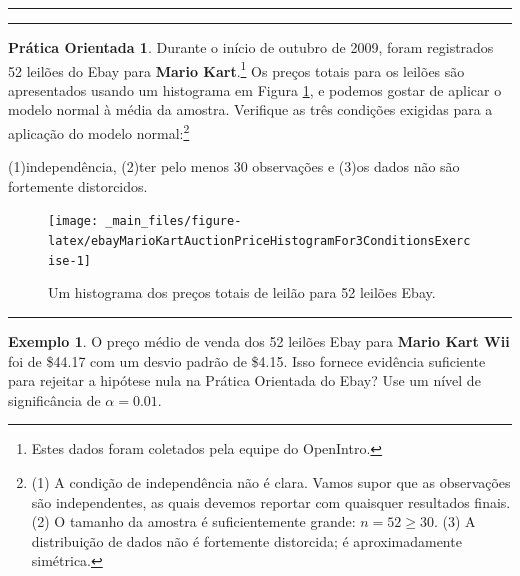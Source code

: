 \documentclass[
]{book}
\theoremstyle{definition}
\theoremstyle{definition}
\newtheorem{example}{Exemplo}[chapter]
\theoremstyle{definition}
\newtheorem{exercise}{Prática Orientada}[chapter]
\theoremstyle{definition}
\theoremstyle{remark}
\begin{document}
\begin{center}\rule{0.5\linewidth}{0.5pt}\end{center}

\begin{center}\rule{0.5\linewidth}{0.5pt}\end{center}

\begin{exercise}
\protect\hypertarget{exr:unnamed-chunk-168}{}{\label{exr:unnamed-chunk-168} }Durante o início de outubro de 2009, foram registrados 52 leilões do Ebay para \textbf{Mario Kart}.\footnote{Estes dados foram coletados pela equipe do OpenIntro.} Os preços totais para os leilões são apresentados usando um histograma em Figura \ref{fig:ebayMarioKartAuctionPriceHistogramFor3ConditionsExercise}, e podemos gostar de aplicar o modelo normal à média da amostra. Verifique as três condições exigidas para a aplicação do modelo normal:\footnote{(1) A condição de independência não é clara. Vamos supor que as observações são independentes, as quais devemos reportar com quaisquer resultados finais. (2) O tamanho da amostra é suficientemente grande: \(n =52 \geq 30\). (3) A distribuição de dados não é fortemente distorcida; é aproximadamente simétrica.}

(1)independência,
(2)ter pelo menos 30 observações e
(3)os dados não são fortemente distorcidos.
\end{exercise}

\begin{figure}

{\centering \texttt{[image: \_main\_files/figure-latex/ebayMarioKartAuctionPriceHistogramFor3ConditionsExercise-1]} 

}

\caption{Um histograma dos preços totais de leilão para 52 leilões Ebay.}\label{fig:ebayMarioKartAuctionPriceHistogramFor3ConditionsExercise}
\end{figure}

\begin{center}\rule{0.5\linewidth}{0.5pt}\end{center}

\begin{example}
\protect\hypertarget{exm:unnamed-chunk-169}{}{\label{exm:unnamed-chunk-169} }O preço médio de venda dos 52 leilões Ebay para \textbf{Mario Kart Wii} foi de \$44.17 com um desvio padrão de \$4.15. Isso fornece evidência suficiente para rejeitar a hipótese nula na Prática Orientada do Ebay? Use um nível de significância de \(\alpha = 0.01\).
\end{example}
\end{document}
